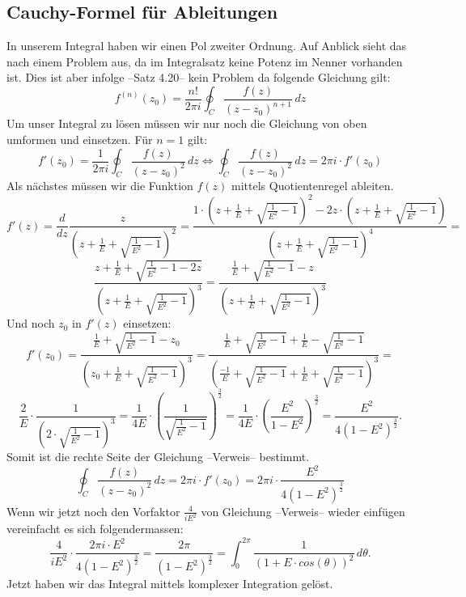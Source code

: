 \subsection{Cauchy-Formel für Ableitungen}
In unserem Integral haben wir einen Pol zweiter Ordnung.
Auf Anblick sieht das nach einem Problem aus, da im Integralsatz keine Potenz im Nenner vorhanden ist.
Dies ist aber infolge --Satz 4.20-- kein Problem da folgende Gleichung gilt:
\[
f^{(n)}(z_0)
=
\frac{n!}{2\pi i}
\oint_C \frac{f(z)}{(z-z_0)^{n+1}}\,dz
\]
Um unser Integral zu lösen müssen wir nur noch die Gleichung von oben umformen und einsetzen.
Für $n=1$ gilt:
\[
f'(z_0)
=
\frac{1}{2\pi i}
\oint_C \frac{f(z)}{(z-z_0)^2}\,dz
\Leftrightarrow
\oint_C \frac{f(z)}{(z-z_0)^2}\,dz
=
2\pi i
\cdot
f'(z_0)
\]
Als nächstes müssen wir die Funktion $f(z)$ mittels Quotientenregel ableiten.
\[
f'(z)
=
\frac{d}{dz}
\frac{z}{(z+\frac{1}{E}+\sqrt{\frac{1}{E^2}-1})^2}
=
\frac{1\cdot(z+\frac{1}{E}+\sqrt{\frac{1}{E^2}-1})^2-2z\cdot(z+\frac{1}{E}+\sqrt{\frac{1}{E^2}-1})}
{(z+\frac{1}{E}+\sqrt{\frac{1}{E^2}-1})^4}
=
\]
\[
\frac{z+\frac{1}{E}+\sqrt{\frac{1}{E^2}-1-2z}}{(z+\frac{1}{E}+\sqrt{\frac{1}{E^2}-1})^3}
=
\frac{\frac{1}{E}+\sqrt{\frac{1}{E^2}-1}-z}{(z+\frac{1}{E}+\sqrt{\frac{1}{E^2}-1})^3}
\]
Und noch $z_0$ in $f'(z)$ einsetzen:
\[
f'(z_0)
=
\frac{\frac{1}{E}+\sqrt{\frac{1}{E^2}-1}-z_0}{(z_0+\frac{1}{E}+\sqrt{\frac{1}{E^2}-1})^3}
=
\frac{\frac{1}{E}+\sqrt{\frac{1}{E^2}-1}+\frac{1}{E}-\sqrt{\frac{1}{E^2}-1}}
{(\frac{-1}{E}+\sqrt{\frac{1}{E^2}-1}+\frac{1}{E}+\sqrt{\frac{1}{E^2}-1})^3}
=
\]
\[
\frac{2}{E} \cdot \frac{1}{(2 \cdot \sqrt{\frac{1}{E^2}-1})^3}
=
\frac{1}{4E} \cdot (\frac{1}{\sqrt{\frac{1}{E^2}-1}})^\frac{3}{2}
=
\frac{1}{4E} \cdot (\frac{E^2}{1-E^2})^\frac{3}{2}
=
\frac{E^2}{4(1-E^2)^\frac{3}{2}}.
\]
Somit ist die rechte Seite der Gleichung --Verweis-- bestimmt.
\[
\oint_C \frac{f(z)}{(z-z_0)^2}\,dz
=
2\pi i
\cdot
f'(z_0)
=
2\pi i
\cdot
\frac{E^2}{4(1-E^2)^\frac{3}{2}}
\]
Wenn wir jetzt noch den Vorfaktor $\frac{4}{iE^2}$ von Gleichung --Verweis-- wieder einfügen vereinfacht es sich folgendermassen:
\[
\frac{4}{iE^2}
\cdot
\frac{2\pi i \cdot E^2}{4(1-E^2)^\frac{3}{2}}
=
\frac{2\pi}{(1-E^2)^\frac{3}{2}}
=
\int_{0}^{2\pi} \frac{1}{(1+E \cdot cos(\theta))^2}\,d\theta.
\]
Jetzt haben wir das Integral mittels komplexer Integration gelöst.

